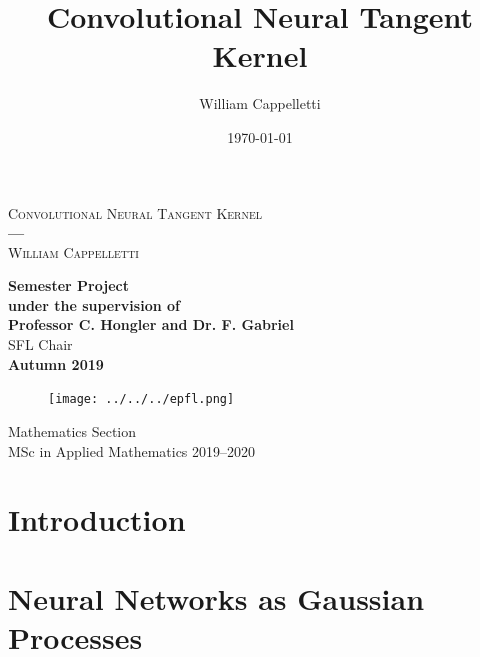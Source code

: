 \documentclass[11pt,notitlepage]{article}
\title{Convolutional Neural Tangent Kernel}
\author{William Cappelletti}
\date{\today}
\numberwithin{equation}{section}
\theoremstyle{remark}
\theoremstyle{definition}
\begin{document}
	\begin{titlepage}
		\centering
		\vspace*{0.6cm}
		{\Huge \textsc{Convolutional Neural Tangent Kernel\\}}
		\vspace*{0.3cm}
		\textbf{---}\\
		\vspace*{0.3cm}
		{\Large \textsc{William Cappelletti\\}}
		\vspace*{1cm}
		
		\begin{abstract}
			\lipsum[2]
		\end{abstract}
		
		
		\vspace*{1.75cm}
		{\large \textbf{Semester Project\\
				\vspace*{0.1cm}
				under the supervision of\\
				Professor C. Hongler and Dr. F. Gabriel}\\}
		\vspace*{0.2cm}
		SFL Chair\\
		\vspace*{1cm}
		\textbf{Autumn 2019}\\
		\begin{figure}[h]
			\begin{center}
				\texttt{[image: ../../../epfl.png]}
			\end{center}
		\end{figure}
		Mathematics Section\\
		MSc in Applied Mathematics 2019--2020
		
		
	
	\end{titlepage}
	
	\tableofcontents		
	
	\newpage
		
	\section{Introduction}\label{sec:Introduction}
	
    \section{Neural Networks as Gaussian Processes}\label{sec:nnAsGaussianPr}
\end{document}
